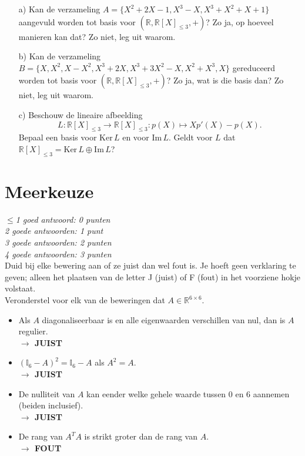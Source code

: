 \documentclass[kulak]{kulakarticle} %
\newcommand{\R}{\mathbb{R}} %
\begin{document}
\begin{itemize}
	\item[a)] Kan de verzameling \(A=\{ X^2+2X-1, X^3-X, X^3+X^2+X+1 \}\) aangevuld worden tot basis voor \((\R, \R[X]_{\leq 3}, +)\)? Zo ja, op hoeveel manieren kan dat? Zo niet, leg uit waarom.
	\item[b)] Kan de verzameling \(B = \{ X, X^2, X-X^2, X^3+2X, X^3+3X^2-X, X^2+X^3,X \}\) gereduceerd worden tot basis voor \((\R, \R[X]_{\leq 3}, +)\)? Zo ja, wat is die basis dan? Zo niet, leg uit waarom.
	\item[c)] Beschouw de lineaire afbeelding \[L:\R[X]_{\leq 3}\to \R[X]_{\leq 3} : p(X) \mapsto Xp'(X)-p(X).\] Bepaal een basis voor \(\text{Ker} \,L\) en voor \(\text{Im} \,L\). Geldt voor \(L\) dat \(\R[X]_{\leq 3}= \text{Ker} \,L \oplus \text{Im} \,L\)?
\end{itemize}

\newpage

\section*{Meerkeuze}

\textit{\(\leq\)1 goed antwoord: 0 punten\\
2 goede antwoorden: 1 punt\\
3 goede antwoorden: 2 punten\\
4 goede antwoorden: 3 punten
}\\

Duid bij elke bewering aan of ze juist dan wel fout is. Je hoeft geen verklaring te geven; alleen het plaatsen van de letter J (juist) of F (fout) in het voorziene hokje volstaat.\\

Veronderstel voor elk van de beweringen dat \(A\in\R^{6\times 6}\).

\begin{itemize}
	\item Als \(A\) diagonaliseerbaar is en alle eigenwaarden verschillen van nul, dan is \(A\) regulier.\\
	\textbf{\(\rightarrow\) JUIST}
	\item \(  (\mathbb{I}_6-A)^2=\mathbb{I}_6-A  \) als \(A^2=A\).\\
	\textbf{\(\rightarrow\) JUIST}
	\item De nulliteit van \(A\) kan eender welke gehele waarde tussen 0 en 6 aannemen (beiden inclusief).\\
	\textbf{\(\rightarrow\) JUIST}
	\item De rang van \(A^TA\) is strikt groter dan de rang van \(A\).\\
	\textbf{\(\rightarrow\) FOUT}
\end{itemize}
\end{document}
